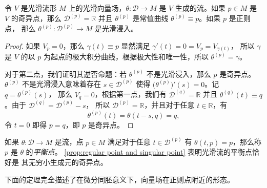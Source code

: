 \begin{proposition}\label{prop:regular point and singular point}
  令 $V$ 是光滑流形 $M$ 上的光滑向量场，$\theta:\mathcal{D}\to M$
  是 $V$ 生成的流。如果 $p\in M$ 是 $V$ 的奇异点，那么 $\mathcal{D}^{(p)}=\mathbb{R}$
  并且 $\theta^{(p)}$ 是常值曲线 $\theta^{(p)}\equiv p$。如果 $p$ 是正则点，
  那么 $\theta^{(p)}:\mathcal{D}^{(p)}\to M$ 是光滑浸入。
\end{proposition}
\begin{proof}
  如果 $V_p=0$，那么 $\gamma(t)\equiv p$ 显然满足 $\gamma'(t)=0=V_p=V_{\gamma(t)}$，
  所以 $\gamma$ 是 $V$ 的以 $p$ 为起点的极大积分曲线，根据极大性和唯一性，所以
  $\theta^{(p)}=\gamma$。

  对于第二点，我们证明其逆否命题：若 $\theta^{(p)}$ 不是光滑浸入，那么 $p$
  是奇异点。$\theta^{(p)}$ 不是光滑浸入意味着存在 $s\in \mathcal{D}^{(p)}$
  使得 $\bigl(\theta^{(p)}\bigr)'(s)=0$。记 $q=\theta^{(p)}(s)$，
  那么 $V_q=0$，根据第一点，我们有 $\mathcal{D}^{(q)}=\mathbb{R}$ 并且
  $\theta^{(q)}(t)\equiv q$。由于 $\mathcal{D}^{(q)}=\mathcal{D}^{(p)}-s$，
  所以 $\mathcal{D}^{(p)}=\mathbb{R}$，并且对于任意 $t\in \mathbb{R}$，有
  \[
    \theta^{(p)}(t)=\theta(t-s,q)=q,
  \]
  令 $t=0$ 即得 $p=q$，即 $p$ 是奇异点。
\end{proof}

如果 $\theta:\mathcal{D}\to M$ 是流，点 $p\in M$ 满足对于任意 $t\in \mathcal{D}^{(p)}$
有 $\theta(t,p)=p$，那么称 $p$ 是 $\theta$ 的\emph{平衡点}。
\autoref{prop:regular point and singular point} 表明光滑流的平衡点恰好是
其无穷小生成元的奇异点。

下面的定理完全描述了在微分同胚意义下，向量场在正则点附近的形态。


